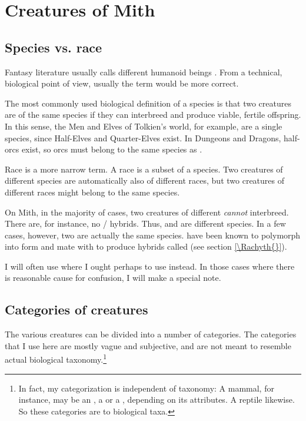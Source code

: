 \chapter{Creatures of Mith}



\section{Species vs. race}

Fantasy literature usually calls different humanoid beings . From a technical, biological point of view, usually the term  would be more correct. 

The most commonly used biological definition of a species is that two creatures are of the same species if they can interbreed and produce viable, fertile offspring. In this sense, the Men and Elves of Tolkien's world, for example, are a single species, since Half-Elves and Quarter-Elves exist. In Dungeons and Dragons, half-orcs exist, so orcs must belong to the same species as \humans. 

Race is a more narrow term. A race is a subset of a species. Two creatures of different species are automatically also of different races, but two creatures of different races might belong to the same species. 

On Mith, in the majority of cases, two creatures of different  \emph{cannot} interbreed. There are, for instance, no \scatha{}/\meccaran{} hybrids. Thus, \scathae{} and \meccara{} are different species. In a few cases, however, two  are actually the same species. \Dragons{} have been known to polymorph into \scatha{} form and mate with \scathae{} to produce hybrids called \rachyth{} (see section \ref{\Rachyth{}}). 

I will often use  where I ought perhaps to use  instead. In those cases where there is reasonable cause for confusion, I will make a special note. 



\section{Categories of creatures}
The various creatures can be divided into a number of  categories. The categories that I use here are mostly vague and subjective, and are not meant to resemble actual biological taxonomy.\footnote{In fact, my categorization is independent of taxonomy: A mammal, for instance, may be an , a  or a , depending on its attributes. A reptile likewise. So these categories are  to biological taxa.} 

